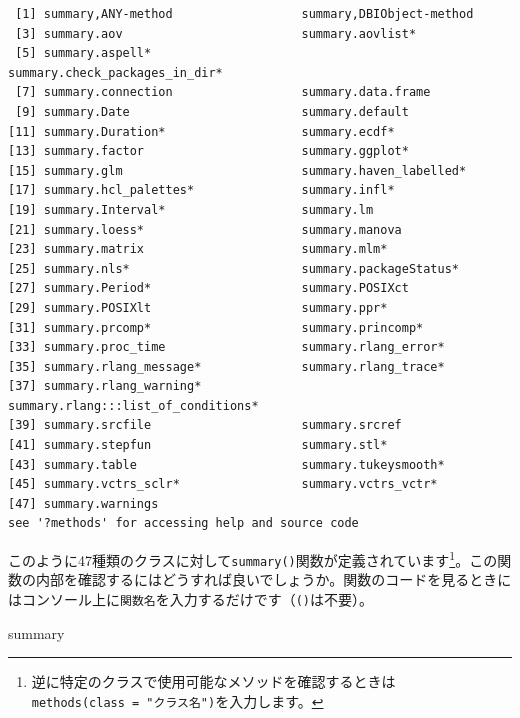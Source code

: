 \documentclass[
  a4paper,
  pandoc,
  ja=standard,
  jafont=haranoaji]{bxjsbook}
\newenvironment{Shaded}{\begin{snugshade}}{\end{snugshade}}
\newcommand{\NormalTok}[1]{\textcolor[rgb]{0.00,0.48,0.65}{#1}}
\begin{document}
\begin{verbatim}
 [1] summary,ANY-method                  summary,DBIObject-method           
 [3] summary.aov                         summary.aovlist*                   
 [5] summary.aspell*                     summary.check_packages_in_dir*     
 [7] summary.connection                  summary.data.frame                 
 [9] summary.Date                        summary.default                    
[11] summary.Duration*                   summary.ecdf*                      
[13] summary.factor                      summary.ggplot*                    
[15] summary.glm                         summary.haven_labelled*            
[17] summary.hcl_palettes*               summary.infl*                      
[19] summary.Interval*                   summary.lm                         
[21] summary.loess*                      summary.manova                     
[23] summary.matrix                      summary.mlm*                       
[25] summary.nls*                        summary.packageStatus*             
[27] summary.Period*                     summary.POSIXct                    
[29] summary.POSIXlt                     summary.ppr*                       
[31] summary.prcomp*                     summary.princomp*                  
[33] summary.proc_time                   summary.rlang_error*               
[35] summary.rlang_message*              summary.rlang_trace*               
[37] summary.rlang_warning*              summary.rlang:::list_of_conditions*
[39] summary.srcfile                     summary.srcref                     
[41] summary.stepfun                     summary.stl*                       
[43] summary.table                       summary.tukeysmooth*               
[45] summary.vctrs_sclr*                 summary.vctrs_vctr*                
[47] summary.warnings                   
see '?methods' for accessing help and source code
\end{verbatim}

このように47種類のクラスに対して\texttt{summary()}関数が定義されています\footnote{逆に特定のクラスで使用可能なメソッドを確認するときは\texttt{methods(class\ =\ "クラス名")}を入力します。}。この関数の内部を確認するにはどうすれば良いでしょうか。関数のコードを見るときにはコンソール上に\texttt{関数名}を入力するだけです（\texttt{()}は不要）。

\begin{Shaded}
\begin{Highlighting}[numbers=left,,]
\NormalTok{summary}
\end{Highlighting}
\end{Shaded}
\end{document}
